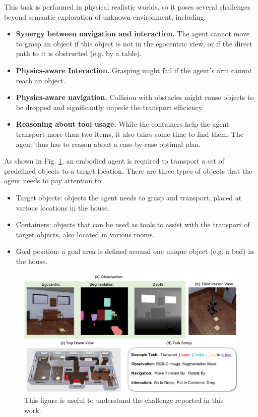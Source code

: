 \newpage
This task is performed in physical realistic worlds, so it poses several challenges beyond semantic exploration of unknown environment, including:

\begin{itemize}
\item \textbf{Synergy between navigation and interaction.} The
agent cannot move to grasp an object if this object is
not in the egocentric view, or if the direct path to it is
obstructed (e.g. by a table).
\item \textbf{Physics-aware Interaction.} Grasping might fail if the
agent’s arm cannot reach an object.
\item \textbf{Physics-aware navigation.} Collision with obstacles
might cause objects to be dropped and significantly impede the transport efficiency.
\item \textbf{Reasoning about tool usage.} While the containers
help the agent transport more than two items, it also
takes some time to find them. The agent thus has to
reason about a case-by-case optimal plan.
\end{itemize}

As shown in Fig. \ref{fig:transport_challenge}, an embodied agent is required
to transport a set of predefined objects to a target location.
There are three types of objects that the agent needs to pay
attention to:
\begin{itemize}
\item Target objects: objects the agent needs to grasp and
transport, placed at various locations in the house.
\item Containers: objects that can be used as tools to assist with the transport of target objects, also located in
various rooms.
\item Goal position: a goal area is defined around one
unique object (e.g, a bed) in the house.
\end{itemize}

\begin{figure}[h!]
	\centering
	\includegraphics[width=0.8\linewidth]{images/transport_challenge.png}
	\caption{This figure is useful to understand the challenge reported in this work.}
	\label{fig:transport_challenge}
\end{figure}

